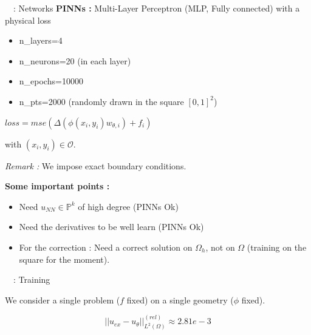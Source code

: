 \begin{frame}{\appendixname~\theappendixframenumber~: Networks}
	\textbf{PINNs :} Multi-Layer Perceptron (MLP, Fully connected) with a physical loss

	\begin{minipage}{0.58\linewidth}
		\centering
		
		\small
		\begin{itemize}[]
			\item n\_layers=4
			\item n\_neurons=20 (in each layer)
			\item n\_epochs=10000
			\item n\_pts=2000 (randomly drawn in the square $[0,1]^2$)
		\end{itemize}
	\end{minipage} \quad
	\begin{minipage}{0.38\linewidth}
		\begin{center}
			$loss = mse(\Delta (\phi(x_i,y_i)w_{\theta,i})+f_i)$
			
			\vspace{1.5pt}
			
		\end{center}
		
		with $(x_i,y_i)\in\mathcal{O}$.
		
		\small
		\textit{Remark :} We impose exact boundary conditions.
	\end{minipage}

	\vspace{5pt}

	\textbf{Some important points :}
	\begin{itemize}[\textbullet]
		\item Need $u_{NN}\in\mathbb{P}^k$ of high degree (PINNs Ok)
		\item Need the derivatives to be well learn (PINNs Ok)
		\item For the correction : Need a correct solution on $\Omega_h$, not on $\Omega$ (training on the square for the moment).
	\end{itemize}
\end{frame}

\begin{frame}{\appendixname~\theappendixframenumber~: Training}
	\begin{center}
	\end{center}
	
	{\selectfont{}\relax} We consider a single problem ($f$ fixed) on a single geometry ($\phi$ fixed).
	 
	$$||u_{ex}-u_\theta||_{L^2(\Omega)}^{(rel)}\approx 2.81e-3$$
\end{frame}

